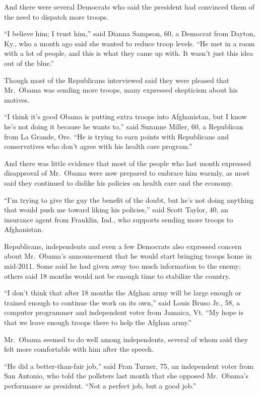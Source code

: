 ﻿\documentclass[12pt]{article}
\begin{document}
And there were several Democrats who said the president had convinced them of the need to dispatch
more troops.

``I believe him; I trust him,'' said Dianna Sampson, 60, a Democrat from Dayton, Ky., who a month
ago said she wanted to reduce troop levels. ``He met in a room with a lot of people, and this is
what they came up with. It wasn't just this idea out of the blue.''

Though most of the Republicans interviewed said they were pleased that Mr.~Obama was sending more
troops, many expressed skepticism about his motives.

``I think it's good Obama is putting extra troops into Afghanistan, but I know he's not doing it
because he wants to,'' said Suzanne Miller, 60, a Republican from La Grande, Ore. ``He is trying to
earn points with Republicans and conservatives who don't agree with his health care program.''

And there was little evidence that most of the people who last month expressed disapproval of
Mr.~Obama were now prepared to embrace him warmly, as most said they continued to dislike his
policies on health care and the economy.

``I'm trying to give the guy the benefit of the doubt, but he's not doing anything that would push
me toward liking his policies,'' said Scott Taylor, 40, an insurance agent from Franklin, Ind., who
supports sending more troops to Afghanistan.

Republicans, independents and even a few Democrats also expressed concern about Mr.~Obama's
announcement that he would start bringing troops home in mid-2011. Some said he had given away too
much information to the enemy; others said 18 months would not be enough time to stabilize the
country.

``I don't think that after 18 months the Afghan army will be large enough or trained enough to
continue the work on its own,'' said Louis Bruso Jr., 58, a computer programmer and independent
voter from Jamaica, Vt. ``My hope is that we leave enough troops there to help the Afghan army.''

Mr.~Obama seemed to do well among independents, several of whom said they felt more comfortable with
him after the speech.

``He did a better-than-fair job,'' said Fran Turner, 75, an independent voter from San Antonio, who
told the pollsters last month that she opposed Mr.~Obama's performance as president. ``Not a perfect
job, but a good job.''
\end{document}
